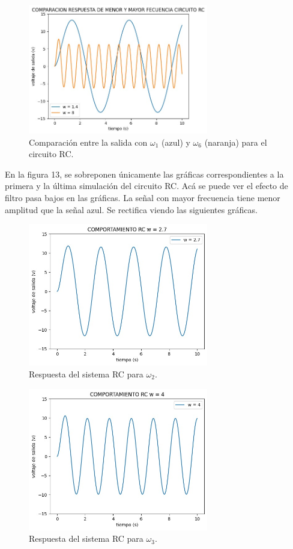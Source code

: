 \documentclass{article}
\begin{document}
\begin{figure}[H]
    \centering
    \includegraphics[width=0.7\textwidth]{OMw1RC.jpg}
    \caption{Comparación entre la salida con $\omega_1$ (azul) y $\omega_6$ (naranja) para el circuito RC.}
    \label{fig:OMRC1y6}
\end{figure}
En la figura 13, se sobreponen únicamente las gráficas correspondientes a la primera y la última simulación del circuito RC. Acá se puede ver el efecto de filtro pasa bajos en las gráficas. La señal con mayor frecuencia tiene menor amplitud que la señal azul. Se rectifica viendo las siguientes gráficas.
\begin{figure}[H]
    \centering
    \includegraphics[width=0.7\textwidth]{OMw2RC.jpg}
    \caption{Respuesta del sistema RC para $\omega_2$.}
\end{figure}

\begin{figure}[H]
    \centering
    \includegraphics[width=0.7\textwidth]{OMw3RC.jpg}
    \caption{Respuesta del sistema RC para $\omega_3$.}
\end{figure}
\end{document}
